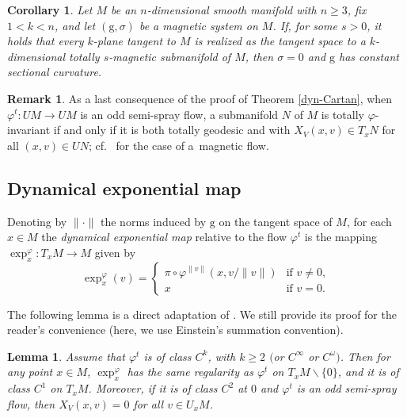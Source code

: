 \documentclass[pdftex]{sigma}
\newcommand{\g}{\mathrm{g}}
\numberwithin{equation}{section}
\newtheorem{Lemma}[Theorem]{Lemma}
\newtheorem{Corollary}[Theorem]{Corollary}
\theoremstyle{definition}
\newtheorem{rem}[Theorem]{Remark}
\begin{document}
\begin{Corollary}\label{cor:mag-cartan}
 Let $M$ be an $n$-dimensional smooth manifold with $n\geq 3$, fix $1<k<n$, and let $(\g,\sigma)$ be a magnetic system on $M$. If, for some $s>0$, it holds that every $k$-plane tangent to $M$ is realized as the tangent space to a $k$-dimensional totally $s$-magnetic submanifold of $M$, then $\sigma=0$ and $\g$ has constant sectional curvature.
\end{Corollary}

\begin{rem}
 As a last consequence of the proof of Theorem \ref{dyn-Cartan}, when $\varphi^t\colon UM\to UM$ is an odd semi-spray flow, a submanifold $N$ of $M$ is totally $\varphi$-invariant if and only if it is both totally geodesic and with $X_V(x,v)\in T_xN$ for all $(x,v)\in UN$; cf.\ \cite[Example 4.3]{terek2025submanifold} for the case of a~magnetic flow.
\end{rem}


\subsection{Dynamical exponential map}

Denoting by $\|\cdot\|$ the norms induced by $\g$ on the tangent space of $M$, for each $x\in M$ the \emph{dynamical ex\-po\-nen\-ti\-al map} relative to the flow $\varphi^t$ is the mapping $\exp_x^{\varphi} \colon T_xM \rightarrow M$ given by
\begin{equation}\label{def-psi-exp} \exp_x^{\varphi}(v) = \begin{cases} \pi \circ \varphi^{\|v\|}(x,v/\|v\|) &\text{if } v \neq 0, \\ x & \text{if } v = 0. \end{cases}\end{equation}

The following lemma is a direct adaptation of \cite[Lemma A.7]{dairbekov2007boundary}. We still provide its proof for the reader's convenience (here, we use Einstein's summation convention).

\begin{Lemma} \label{lem:dynamical-exp}
 Assume that $\varphi^t$ is of class $C^k$, with $k \geq 2$ $($or $C^\infty$ or $C^\omega)$. Then for any point $x\in M$, $\exp^\varphi_x$ has the same regularity as $\varphi^t$ on $T_xM\smallsetminus \{0\}$, and it is of class $C^1$ on $T_xM$. Moreover, if it is of class $C^2$ at $0$ and $\varphi^t$ is an odd semi-spray flow, then $X_V(x,v) = 0$ for all $v\in U_xM$.
\end{Lemma}
\end{document}
